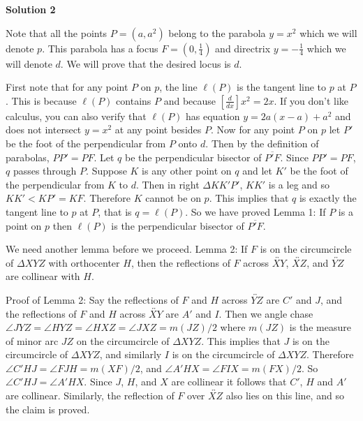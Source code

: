 \begin{enumerate}
\textbf{Solution 2}

Note that all the points $P=(a,a^2)$ belong to the parabola $y=x^2$ which we will denote $p$. This parabola has a focus $F=\left(0,\frac{1}{4}\right)$ and directrix $y=-\frac{1}{4}$ which we will denote $d$. We will prove that the desired locus is $d$.

 First note that for any point $P$ on $p$, the line $\ell(P)$ is the tangent line to $p$ at $P$. This is because $\ell(P)$ contains $P$ and because $[\frac{d}{dx}] x^2=2x$. If you don't like calculus, you can also verify that $\ell(P)$ has equation $y=2a(x-a)+a^2$ and does not intersect $y=x^2$ at any point besides $P$. Now for any point $P$ on $p$ let $P'$ be the foot of the perpendicular from $P$ onto $d$. Then by the definition of parabolas, $PP'=PF$. Let $q$ be the perpendicular bisector of $\overline{P'F}$. Since $PP'=PF$, $q$ passes through $P$. Suppose $K$ is any other point on $q$ and let $K'$ be the foot of the perpendicular from $K$ to $d$. Then in right $\Delta KK'P'$, $KK'$ is a leg and so $KK'<KP'=KF$. Therefore $K$ cannot be on $p$. This implies that $q$ is exactly the tangent line to $p$ at $P$, that is $q=\ell(P)$. So we have proved Lemma 1: If $P$ is a point on $p$ then $\ell(P)$ is the perpendicular bisector of $\overline{P'F}$.

 We need another lemma before we proceed. Lemma 2: If $F$ is on the circumcircle of $\Delta XYZ$ with orthocenter $H$, then the reflections of $F$ across $\overleftrightarrow{XY}$, $\overleftrightarrow{XZ}$, and $\overleftrightarrow{YZ}$ are collinear with $H$.

 Proof of Lemma 2: Say the reflections of $F$ and $H$ across $\overleftrightarrow{YZ}$ are $C'$ and $J$, and the reflections of $F$ and $H$ across $\overleftrightarrow{XY}$ are $A'$ and $I$. Then we angle chase $\angle JYZ=\angle HYZ=\angle HXZ=\angle JXZ=m(JZ)/2$ where $m(JZ)$ is the measure of minor arc $JZ$ on the circumcircle of $\Delta XYZ$. This implies that $J$ is on the circumcircle of $\Delta XYZ$, and similarly $I$ is on the circumcircle of $\Delta XYZ$. Therefore $\angle C'HJ=\angle FJH=m(XF)/2$, and $\angle A'HX=\angle FIX=m(FX)/2$. So $\angle C'HJ = \angle A'HX$. Since $J$, $H$, and $X$ are collinear it follows that $C'$, $H$ and $A'$ are collinear. Similarly, the reflection of $F$ over $\overleftrightarrow{XZ}$ also lies on this line, and so the claim is proved.


\end{enumerate}
